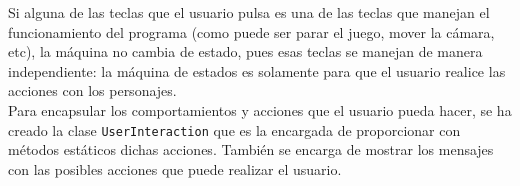 Si alguna de las teclas que el usuario pulsa es una de las teclas que manejan el funcionamiento del programa (como puede ser parar el juego, mover la cámara, etc), la máquina no cambia de estado, pues esas teclas se manejan de manera independiente: la máquina de estados es solamente para que el usuario realice las acciones con los personajes. \\

Para encapsular los comportamientos y acciones que el usuario pueda hacer, se ha creado la clase \texttt{UserInteraction} que es la encargada de proporcionar con métodos estáticos dichas acciones. También se encarga de mostrar los mensajes con las posibles acciones que puede realizar el usuario.